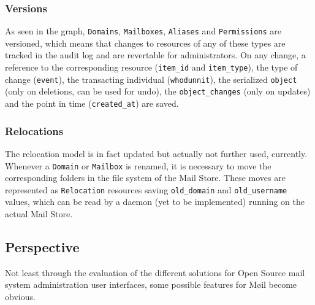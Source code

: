 \documentclass[12pt,a4paper]{scrartcl}
\begin{document}
			\subsubsection{Versions}
				As seen in the graph, \texttt{Domains}, \texttt{Mailboxes},
				\texttt{Aliases} and \texttt{Permissions} are versioned, which
				means that changes to resources of any of these types are
				tracked in the audit log and are revertable for administrators.
				On any change, a reference to the corresponding resource
				(\texttt{item\_id} and \texttt{item\_type}), the type of change
				(\texttt{event}), the transacting individual
				(\texttt{whodunnit}), the serialized \texttt{object} (only on
				deletions, can be used for undo), the \texttt{object\_changes}
				(only on updates) and the point in time (\texttt{created\_at})
				are saved.

			\subsubsection{Relocations}
			\label{sec:moeil:model:relocation}
				The relocation model is in fact updated but actually not
				further used, currently. Whenever a \texttt{Domain} or
				\texttt{Mailbox} is renamed, it is necessary to move the
				corresponding folders in the file system of the Mail Store.
				These moves are represented as \texttt{Relocation} resources
				saving \texttt{old\_domain} and \texttt{old\_username} values,
				which can be read by a daemon (yet to be implemented) running
				on the actual Mail Store.

		\subsection{Perspective}
			Not least through the evaluation of the different solutions for
			Open Source mail system administration user interfaces, some
			possible features for Møil become obvious.
\end{document}
